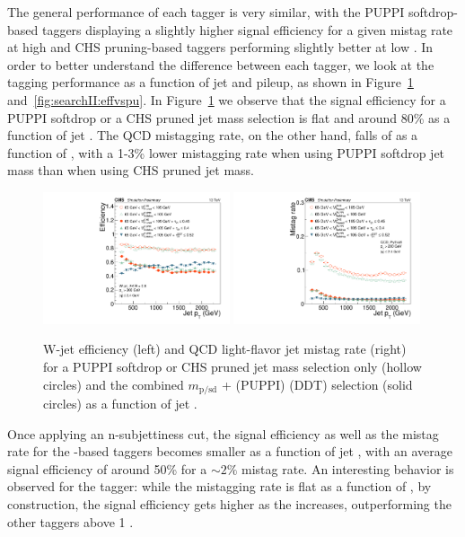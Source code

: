 The general performance of each tagger is very similar, with the PUPPI softdrop-based taggers displaying a slightly higher signal efficiency for a given mistag rate at high \PT and CHS pruning-based taggers performing slightly better at low \PT.
In order to better understand the difference between each tagger, we look at the tagging performance as a function of jet \PT and pileup, as shown in Figure~\ref{fig:searchII:effvspt} and~\ref{fig:searchII:effvspu}. In Figure~\ref{fig:searchII:effvspt} we observe that the signal efficiency for a PUPPI softdrop or a CHS pruned jet mass selection is flat and around 80\% as a function of jet \PT. The QCD mistagging rate, on the other hand, falls of as a function of \PT, with a 1-3\% lower mistagging rate when using PUPPI softdrop jet mass than when using CHS pruned jet mass.
\begin{figure}[h!]
\centering
\includegraphics[width=0.49\textwidth]{figures/vtagging/JME-16-003/BoostedW/WtagSigEffvsPT.pdf}
\includegraphics[width=0.49\textwidth]{figures/vtagging/JME-16-003/BoostedW/QCDBkgEffvsPT.pdf}
\caption{W-jet efficiency (left) and QCD light-flavor jet mistag rate (right) for a PUPPI softdrop or CHS pruned jet mass selection only (hollow circles) and the combined $m_{\mathrm{p/sd}}$ + (PUPPI) \nsubj (DDT) selection (solid circles) as a function of jet \PT.}
\label{fig:searchII:effvspt}
\end{figure}
Once applying an n-subjettiness cut, the signal efficiency as well as the mistag rate for the \nsubj-based taggers becomes smaller as a function of jet \PT, with an average signal efficiency of around 50\% for a $\sim 2\%$ mistag rate. An interesting behavior is observed for the \ddt tagger: while the mistagging rate is flat as a function of \PT, by construction, the signal efficiency gets higher as the \PT increases, outperforming the other taggers above 1 \TeV. \par
